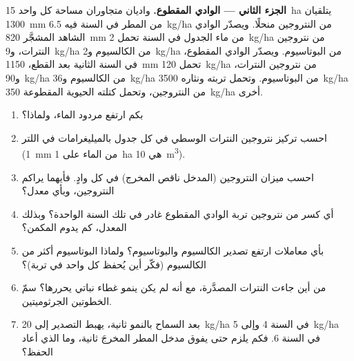 \begin{problem}
\medskip
\noindent\textbf{الجزء الثاني --- الوادي المقطوع.}
واديان متجاوران مساحة كل واحد \qty{15}{ha} يتلقيان \qty{1300}{mm} من
المطر في السنة فيه \qty{6.5}{kg/ha} من النتروجين منحلًا. ويصدّر
الوادي الشاهد المشجَّر \qty{820}{mm} من ماء الجدول في السنة
تحمل \qty{2}{kg/ha} من نتروجين النترات، و\qty{9}{kg/ha} من الكالسيوم
و\qty{2}{kg/ha} من البوتاسيوم. ويصدّر الوادي المقطوع، في السنة الثانية
بعد القطع، \qty{1150}{mm} تحمل \qty{120}{kg/ha} من
نتروجين النترات، و\qty{90}{kg/ha} من الكالسيوم و\qty{36}{kg/ha} من
البوتاسيوم. وتحمل تربته ونثاره \qty{3500}{kg/ha} من النتروجين،
وتحمل كتلته الحيوية المقطوعة \qty{350}{kg/ha} أخرى.
\begin{enumerate}[resume]
  \item بكم ارتفع مردود الماء، ولماذا؟
  \item احسب تركيز نتروجين النترات الوسطي في كل جدول
        بالميليغرامات في اللتر (\qty{1}{mm} من الماء على \qty{1}{ha} هي
        \qty{10}{m^3}).
  \item احسب ميزان النتروجين (المدخل ناقص المخرج) في كل
        وادٍ. فأيهما يراكم النتروجين، وبأي معدل؟
  \item أي كسر من نتروجين تربة الوادي المقطوع غادر في
        تلك السنة الواحدة؟ وبذلك المعدل، كم يدوم المكمن؟
  \item بأي معاملات ارتفع تصدير الكالسيوم والبوتاسيوم؟
        ولماذا البوتاسيوم أكثر من الكالسيوم (فكّر أين يُحفظ كل واحد
        في تربة)؟
  \item من أين جاءت النترات المصدَّرة، مع أنه لم يكن ينمو
        غطاء نباتي يحررها؟ سمّ الخطوتين الجرثوميتين.
  \item بعد السماح بالنمو ثانية، يهبط التصدير إلى \qty{20}{kg/ha}
        في السنة 4 وإلى \qty{5}{kg/ha} في السنة 6. فكم يلزم حتى
        يفوق مدخل المطر المخرجَ ثانية، وما الذي أعاد
        الحفظ؟
\end{enumerate}


\end{problem}
